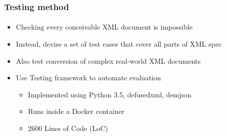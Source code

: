 \documentclass[
    alternativetitlepage=alternativ,
    cornerlogo=hgi_nds_logo2,
    sectionoverview,
]{rubpresentation}
\begin{document}
\begin{frame}
  \frametitle{Testing method}
  \framesubtitle{}
  \begin{itemize}
    \item{} Checking every conceivable XML document is impossible
    \item{} Instead, devise a set of test cases that cover all parts of XML spec
    \item{} Also test conversion of complex real-world XML documents
    \item{} Use Testing framework to automate evaluation
      \begin{itemize}
        \item{} Implemented using Python 3.5, defusedxml, demjson
        \item{} Runs inside a Docker container
        \item{} 2600 Lines of Code (LoC)
      \end{itemize}
  \end{itemize}
\end{frame}

\begingroup
  \begin{frame}[fragile]
    \vspace{-1cm}
    \begin{center}
      
    \end{center}
  \end{frame}
\endgroup

\begingroup
  \begin{frame}[fragile]
    \vspace{-1cm}
    \begin{center}
      
    \end{center}
  \end{frame}
\endgroup
\end{document}
